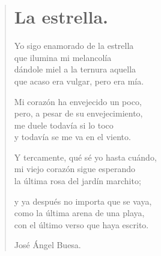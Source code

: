 \documentclass[11pt, portrait, twoside, notitlepage, openright]{book}
\begin{document}
\newpage
\begin{verse}
\begin{center}
\section{La estrella.}
\end{center}
Yo sigo enamorado de la estrella\\
que ilumina mi melancolía\\
dándole miel a la ternura aquella\\
que acaso era vulgar, pero era mía.
\newline

Mi corazón ha envejecido un poco,\\
pero, a pesar de su envejecimiento,\\
me duele todavía si lo toco\\
y todavía se me va en el viento.
\newline

Y tercamente, qué sé yo hasta cuándo,\\
mi viejo corazón sigue esperando\\
la última rosa del jardín marchito;
\newline

y ya después no importa que se vaya,\\
como la última arena de una playa,\\
con el último verso que haya escrito.
\newline

José Ángel Buesa.
\end{verse}
\end{document}

